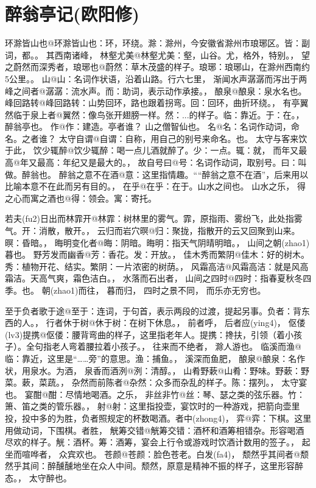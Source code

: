 \documentclass[a4paper]{article}
\begin{document}
\section[]{醉翁亭记(\fangti 欧阳修)\zynotemark{}}


环滁皆山也@{环滁皆山也：环，环绕。滁：滁州，今安徽省滁州市琅琊区。皆：副词，都。}。
其西南诸峰，
林壑尤美@{林壑尤美：壑，山谷。尤，格外，特别。}，
望之蔚然而深秀者，琅琊也@{蔚然：草木茂盛的样子。琅琊：琅琊山，在滁州西南约5公里。}。
山@{山：名词作状语，沿着山路。}行六七里，
渐闻水声潺潺而泻出于两峰之间者@{潺潺：流水声。而：助词，表示动作承接。}，
酿泉@{酿泉：泉水名}也。
峰回路转@{峰回路转：山势回环，路也跟着拐弯。回：回环，曲折环绕。}，
有亭翼然临于泉上者@{翼然：像鸟张开翅膀一样。然：...的样子。临：靠近。于：在。}，
醉翁亭也。
作@{作：建造。}亭者谁？
山之僧智仙也。
名@{名：名词作动词，命名。}之者谁？
太守自谓@{自谓：自称，用自己的别号来命名。}也。
太守与客来饮于此，
饮少辄醉@{饮少辄醉：喝一点儿酒就醉了。少：一点。辄：就}，
而年又最高@{年又最高：年纪又是最大的。}，
故自号曰@{号：名词作动词，取别号。曰：叫做。}醉翁也。
醉翁之意不在酒@{意：这里指情趣。““醉翁之意不在酒”，后来用以比喻本意不在此而另有目的。}，
在乎@{在乎：在于。}山水之间也。
山水之乐，
得之心而寓之酒也@{得：领会。寓：寄托}。

若夫(fu2)日出而林霏开@{林霏：树林里的雾气。霏，原指雨、雾纷飞，此处指雾气。开：消散，散开。}，
云归而岩穴暝@{归：聚拢，指散开的云又回聚到山来。暝：昏暗。}，
晦明变化者@{晦：阴暗。晦明：指天气阴晴明暗。}，
山间之朝(zhao1)暮也。
野芳发而幽香@{芳：香花。发：开放。}，
佳木秀而繁阴@{佳木：好的树木。秀：植物开花、结实。繁阴：一片浓密的树荫。}，
风霜高洁@{风霜高洁：就是风高霜洁。天高气爽，霜色洁白。}，
水落而石出者，
山间之四时@{四时：指春夏秋冬四季。}也。
朝(zhao1)而往，
暮而归，
四时之景不同，
而乐亦无穷也。

至于负者歌于途@{至于：连词，于句首，表示两段的过渡，提起另事。负者：背东西的人。}，
行者休于树@{休于树：在树下休息。}，
前者呼，
后者应(ying4)，
伛偻(lv3)提携@{伛偻：腰背弯曲的样子，这里指老年人。提携：搀扶，引领（着小孩子）。全句指老人弯着腰拉着小孩子。}，
往来而不绝者，
滁人游也。
临溪而渔@{临：靠近，这里是“……旁”的意思。渔：捕鱼。}，
溪深而鱼肥，
酿泉@{酿泉：名作状，用泉水。}为酒，
泉香而酒洌@{洌：清醇。}，
山肴野蔌@{山肴：野味。野蔌：野菜。蔌，菜蔬。}，
杂然而前陈者@{杂然：众多而杂乱的样子。陈：摆列。}，
太守宴也。
宴酣@{酣：尽情地喝酒。}之乐，
非丝非竹@{丝：琴、瑟之类的弦乐器。竹：箫、笛之类的管乐器。}，
射@{射：这里指投壶，宴饮时的一种游戏，把箭向壶里投，投中多的为胜，负者照规定的杯数喝酒。}者中(zhong4)，
弈@{弈：下棋。这里用做动词，下围棋。}者胜，
觥筹交错@{觥筹交错：酒杯和酒筹相错杂。形容喝酒尽欢的样子。觥：酒杯。筹：酒筹，宴会上行令或游戏时饮酒计数用的签子。}，
起坐而喧哗者，
众宾欢也。
苍颜@{苍颜：脸色苍老。}白发(fa4)，
颓然乎其间者@{颓然乎其间：醉醺醺地坐在众人中间。颓然，原意是精神不振的样子，这里形容醉态。}，
太守醉也。
\end{document}
